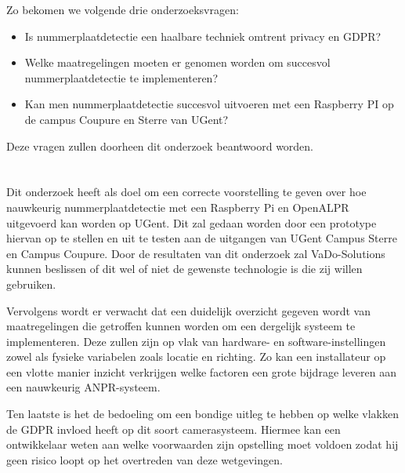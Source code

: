 Zo bekomen we volgende drie onderzoeksvragen:
\begin{itemize}
	\item Is nummerplaatdetectie een haalbare techniek omtrent privacy en GDPR?
	\item Welke maatregelingen moeten er genomen worden om succesvol nummerplaatdetectie te implementeren?
	\item Kan men nummerplaatdetectie succesvol uitvoeren met een Raspberry PI op de campus Coupure en Sterre van UGent?
\end{itemize}

Deze vragen zullen doorheen dit onderzoek beantwoord worden.

\section{}
\label{sec:onderzoeksdoelstelling}


Dit onderzoek heeft als doel om een correcte voorstelling te geven over hoe nauwkeurig nummerplaatdetectie met een Raspberry Pi en OpenALPR uitgevoerd kan worden op UGent. Dit zal gedaan worden door een prototype hiervan op te stellen en uit te testen aan de uitgangen van UGent Campus Sterre en Campus Coupure. Door de resultaten van dit onderzoek zal VaDo-Solutions kunnen beslissen of dit wel of niet de gewenste technologie is die zij willen gebruiken.

Vervolgens wordt er verwacht dat een duidelijk overzicht gegeven wordt van maatregelingen die getroffen kunnen worden om een dergelijk systeem te implementeren. Deze zullen zijn op vlak van hardware- en software-instellingen zowel als fysieke variabelen zoals locatie en richting. Zo kan een installateur op een vlotte manier inzicht verkrijgen welke factoren een grote bijdrage leveren aan een nauwkeurig ANPR-systeem.

Ten laatste is het de bedoeling om een bondige uitleg te hebben op welke vlakken de GDPR invloed heeft op dit soort camerasysteem. Hiermee kan een ontwikkelaar weten aan welke voorwaarden zijn opstelling moet voldoen zodat hij geen risico loopt op het overtreden van deze wetgevingen.

\section{}
\label{sec:opzet-bachelorproef}

